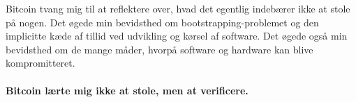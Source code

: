 Bitcoin tvang mig til at reflektere over, hvad det egentlig indebærer ikke at 
stole på nogen. Det øgede min bevidsthed om bootstrapping-problemet og den 
implicitte kæde af tillid ved udvikling og kørsel af software. Det øgede også 
min bevidsthed om de mange måder, hvorpå software og hardware kan blive
kompromitteret.

\paragraph{Bitcoin lærte mig ikke at stole, men at verificere.}

%
%
%
%
